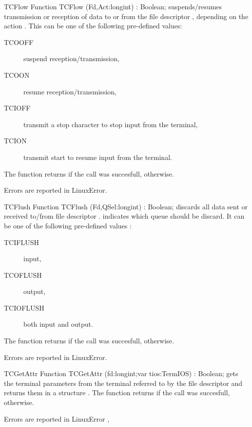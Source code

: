 \begin{function}{TCFlow}
\Declaration
Function TCFlow (Fd,Act:longint) : Boolean;
\Description
  suspends/resumes transmission or reception of data to or from the file
descriptor , depending
  on the action . This can be one of the following pre-defined
values: 
\begin{description}
\item [TCOOFF\ ] suspend reception/transmission,
\item [TCOON\ ] resume  reception/transmission,
\item [TCIOFF\ ] transmit a stop character to stop input from the terminal, 
\item [TCION\ ] transmit start to resume input from the terminal.
\end{description}
The function returns  if the call was succesfull, 
otherwise.

\Errors
Errors are reported in LinuxError.
\SeeAlso
{}
\end{function}

\begin{function}{TCFlush}
\Declaration
Function TCFlush (Fd,QSel:longint) : Boolean;
\Description
  discards all data sent or received to/from file descriptor . 
  indicates which queue
  should be discard. It can be one of the following pre-defined values :
\begin{description}
\item [TCIFLUSH\ ] input,
\item [TCOFLUSH\ ] output,
\item [TCIOFLUSH\ ] both input and output.
\end{description}
The function returns  if the call was succesfull, 
otherwise.

\Errors
Errors are reported in LinuxError.
\SeeAlso
{}
\end{function}

\begin{function}{TCGetAttr}
\Declaration
Function TCGetAttr (fd:longint;var tios:TermIOS) : Boolean;
\Description
  gets the terminal parameters from the terminal referred to by the file
  descriptor  and returns them in a  structure . 
The function returns  if the call was succesfull, 
otherwise.

\Errors
Errors are reported in LinuxError
\SeeAlso
{},  
\end{function}

